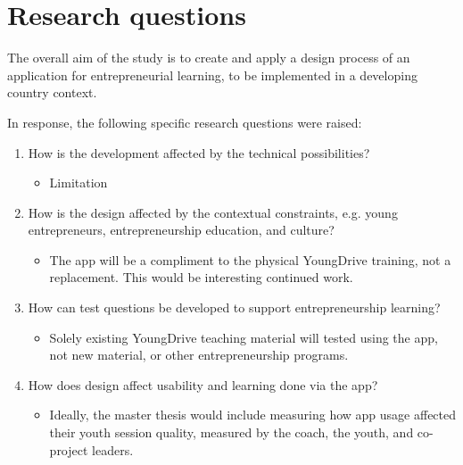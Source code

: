 \section{Research questions}

The overall aim of the study is to create and apply a design process of an application for entrepreneurial learning, to be implemented in a developing country context.

In response, the following specific research questions were raised:

\begin{enumerate}
    \item How is the development affected by the technical possibilities?
    \begin{itemize}
    \item Limitation 
    \end{itemize}

    \item How is the design affected by the contextual  constraints, e.g. young entrepreneurs, entrepreneurship education, and culture? %
    \begin{itemize}
        \item The app will be a compliment to the physical YoungDrive training, not a replacement. This would be interesting continued work.
    \end{itemize}


    \item How can test questions be developed to support entrepreneurship learning? %
    \begin{itemize}
        \item Solely existing YoungDrive teaching material will tested using the app, not new material, or other entrepreneurship programs.
    \end{itemize}

    \item How does design affect usability and learning done via the app? %
    \begin{itemize}
        \item Ideally, the master thesis would include measuring how app usage affected their youth session quality, measured by the coach, the youth, and co-project leaders.


\end{itemize}
\end{enumerate}
